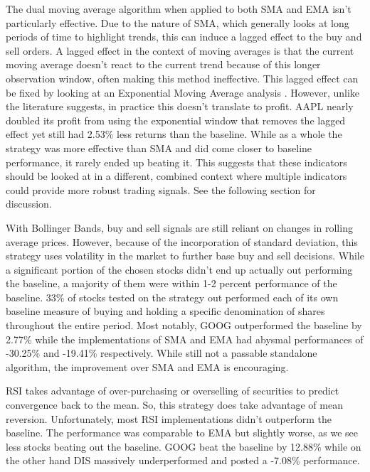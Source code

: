\documentclass[letterpaper,11pt]{article}
\begin{document}
The dual moving average algorithm when applied to both SMA and EMA isn't particularly effective. Due to the nature of SMA, which generally looks at long periods of time to highlight trends, this can induce a lagged effect to the buy and sell orders. A lagged effect in the context of moving averages is that the current moving average doesn't react to the current trend because of this longer observation window, often making this method ineffective. This lagged effect can be fixed by looking at an Exponential Moving Average analysis \cite{Ehlers}. However, unlike the literature suggests, in practice this doesn't translate to profit. AAPL nearly doubled its profit from using the exponential window that removes the lagged effect yet still had 2.53\% less returns than the baseline. While as a whole the strategy was more effective than SMA and did come closer to baseline performance, it rarely ended up beating it. This suggests that these indicators should be looked at in a different, combined context where multiple indicators could provide more robust trading signals. See the following section for discussion. 

With Bollinger Bands, buy and sell signals are still reliant on changes in rolling average prices. However, because of the incorporation of standard deviation, this strategy uses volatility in the market to further base buy and sell decisions. While a significant portion of the chosen stocks didn't end up actually out performing the baseline, a majority of them were within 1-2 percent performance of the baseline. 33\% of stocks tested on the strategy out performed each of its own baseline measure of buying and holding a specific denomination of shares throughout the entire period. Most notably, GOOG outperformed the baseline by 2.77\% while the implementations of SMA and EMA had abysmal performances of -30.25\% and -19.41\% respectively. While still not a passable standalone algorithm, the improvement over SMA and EMA is encouraging.

RSI takes advantage of over-purchasing or overselling of securities to predict convergence back to the mean. So, this strategy does take advantage of mean reversion. Unfortunately, most RSI implementations didn't outperform the baseline. The performance was comparable to EMA but slightly worse, as we see less stocks beating out the baseline. GOOG beat the baseline by 12.88\% while on the other hand DIS massively underperformed and posted a -7.08\% performance. 
\end{document}
